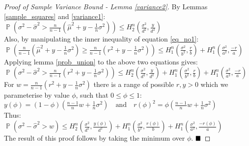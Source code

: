 \documentclass[runningheads, envcountsame, a4paper]{llncs}
\DeclareMathOperator{\p}{\mathbb{P}}
\begin{document}
\begin{proof}[Proof of Sample Variance Bound - Lemma \ref{variance2}]
By Lemmas \ref{sample_squares} and \ref{variance1}:\\
\-\hspace{3mm}\(\p\left(\sigma^2 - \hat{\sigma}^2 > \frac{n}{n-1}\left(\hat{\mu}^2+y- \frac{1}{n}\sigma^2\right)\right) 
\le H_2^n\left(\frac{\sigma^2}{d^2},\frac{y}{d^2}\right)\)\\
Also, by manipulating the inner inequality of equation \ref{eq_no1}:\\ \-\hspace{3mm}\(\p\left(\frac{n}{n-1}\left(\hat{\mu}^2+y-\frac{1}{n}\sigma^2\right)\ge \frac{n}{n-1}\left(r^2+y-\frac{1}{n}\sigma^2\right)\right) \le H_1^n\left(\frac{\sigma^2}{b^2},\frac{r}{b}\right)+H_1^n\left(\frac{\sigma^2}{a^2},\frac{-r}{a}\right)\)\\
Applying lemma \ref{prob_union} to the above two equations gives:\\
\-\hspace{3mm}\(\p\left(\sigma^2 - \hat{\sigma}^2 > \frac{n}{n-1}\left(r^2+y-\frac{1}{n}\sigma^2\right)\right) \le H_2^n\left(\frac{\sigma^2}{d^2},\frac{y}{d^2}\right)+H_1^n\left(\frac{\sigma^2}{b^2},\frac{r}{b}\right)+H_1^n\left(\frac{\sigma^2}{a^2},\frac{-r}{a}\right)\)\\
For $w=\frac{n}{n-1}\left(r^2+y-\frac{1}{n}\sigma^2\right)$ there is a range of possible $r,y>0$ which we parameterise by value $\phi$, such that $0\le\phi\le 1$:\\
\-\hspace{3mm}\(y(\phi) = (1-\phi)\left(\frac{n-1}{n}w+\frac{1}{n}\sigma^2\right) \quad\text{and}\quad
r(\phi)^2 = \phi\left(\frac{n-1}{n}w+\frac{1}{n}\sigma^2\right)\)\\
Thus:\\
\-\hspace{3mm}\(\p\left(\sigma^2 - \hat{\sigma}^2 > w\right) 
\le H_2^n\left(\frac{\sigma^2}{d^2},\frac{y(\phi)}{d^2}\right) 
  + H_1^n\left(\frac{\sigma^2}{b^2},\frac{r(\phi)}{b}\right) + H_1^n\left(\frac{\sigma^2}{a^2},\frac{-r(\phi)}{a}\right)\)\\
The result of this proof follows by taking the minimum over $\phi$.
$\hfill\blacksquare$
\end{proof}
\end{document}
